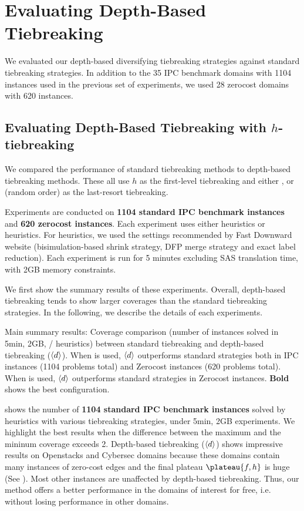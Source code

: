 
\section{Evaluating Depth-Based Tiebreaking}
\label{sec:depth-based-evaluation}
We evaluated our depth-based diversifying tiebreaking strategies against standard
tiebreaking strategies.
In addition to the 35 IPC benchmark domains with 1104 instances used in
the previous set of experiments, we used 28 zerocost domains with 620
instances.

\subsection{Evaluating Depth-Based Tiebreaking with $h$-tiebreaking}

We compared the performance of standard tiebreaking methods to
depth-based tiebreaking methods. These all use $h$ as the first-level
tiebreaking and either \fifo, \lifo or \ro (random order) as the
last-resort tiebreaking.

Experiments are conducted on \textbf{1104 standard IPC benchmark
instances} and \textbf{620 zerocost instances}.  Each experiment uses
either \lmcut heuristics or \mands heuristics.  For \mands heuristics,
we used the settings recommended by Fast Downward website
(bisimulation-based shrink strategy, DFP merge strategy and exact label
reduction). Each experiment is run for 5 minutes excluding SAS
translation time, with 2GB memory constraints.

We first show the summary results of these experiments.
Overall, depth-based tiebreaking tends to show larger coverages than the
standard tiebreaking strategies. In the following, we describe the
details of each experiments.

\begin{table}[htb]
 {
 \centering
 \setlength{\tabcolsep}{3pt}
 
 \caption{
 Main summary results: Coverage comparison (number of instances solved in 5min, 2GB, \lmcut/\mands
 heuristics) between standard tiebreaking and depth-based tiebreaking
 (${\left<d\right>}$). When \lmcut is used, ${\left<d\right>}$ outperforms standard strategies both in IPC
 instances (1104 problems total) and Zerocost instances (620 problems
 total). When \mands is used, ${\left<d\right>}$ outperforms standard strategies
 in Zerocost instances. \textbf{Bold} shows the best configuration.}
 \label{tbl:lmcut-ipc-full}
 }
\end{table}

 shows the number of \textbf{1104 standard
IPC benchmark instances} solved by \lmcut heuristics with various
tiebreaking strategies, under 5min, 2GB experiments. We highlight the
best results when the difference between the maximum and the mininum
coverage exceeds 2.  Depth-based tiebreaking (${\left<d\right>}$) shows
impressive results on Openstacks and Cybersec domains because these
domains contain many instances of zero-cost edges and the final plateau
$\plateau{f,h}$ is huge (See ).  Most other instances
are unaffected by depth-based tiebreaking.  Thus, our method offers a
better performance in the domains of interest for free, i.e. without
losing performance in other domains.

